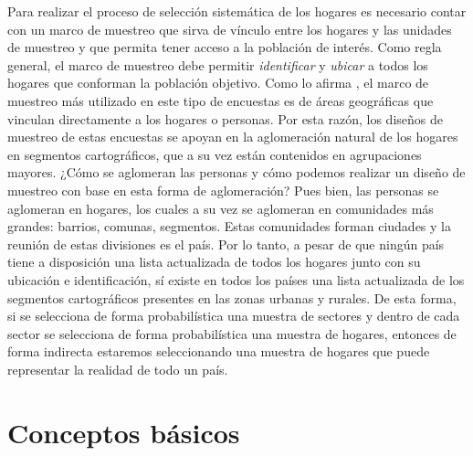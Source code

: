 \documentclass[12pt,spanish,]{book}
\begin{document}
Para realizar el proceso de selección sistemática de los hogares es necesario contar con un marco de muestreo que sirva de vínculo entre los hogares y las unidades de muestreo y que permita tener acceso a la población de interés. Como regla general, el marco de muestreo debe permitir \emph{identificar} y \emph{ubicar} a todos los hogares que conforman la población objetivo. Como lo afirma \textcite{Gutierrez_2016}, el marco de muestreo más utilizado en este tipo de encuestas es de áreas geográficas que vinculan directamente a los hogares o personas. Por esta razón, los diseños de muestreo de estas encuestas se apoyan en la aglomeración natural de los hogares en segmentos cartográficos, que a su vez están contenidos en agrupaciones mayores. ¿Cómo se aglomeran las personas y cómo podemos realizar un diseño de muestreo con base en esta forma de aglomeración? Pues bien, las personas se aglomeran en hogares, los cuales a su vez se aglomeran en comunidades más grandes: barrios, comunas, segmentos. Estas comunidades forman ciudades y la reunión de estas divisiones es el país. Por lo tanto, a pesar de que ningún país tiene a disposición una lista actualizada de todos los hogares junto con su ubicación e identificación, sí existe en todos los países una lista actualizada de los segmentos cartográficos presentes en las zonas urbanas y rurales. De esta forma, si se selecciona de forma probabilística una muestra de sectores y dentro de cada sector se selecciona de forma probabilística una muestra de hogares, entonces de forma indirecta estaremos seleccionando una muestra de hogares que puede representar la realidad de todo un país.

\hypertarget{conceptos-basicos}{%
\section{Conceptos básicos}\label{conceptos-basicos}}
\end{document}
